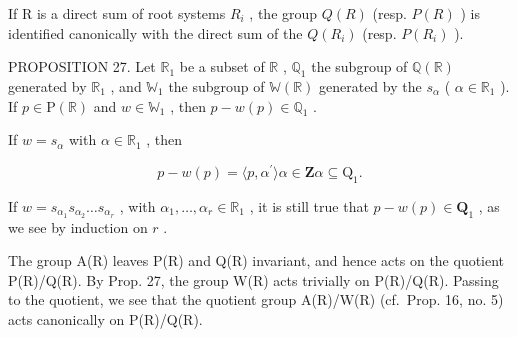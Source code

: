 If R is a direct sum of root systems \(R_{i}\) , the group \(Q(R)\) (resp. \(P(R)\) ) is identified canonically with the direct sum of the \(Q(R_{i})\) (resp. \(P(R_{i})\) ).

PROPOSITION 27. Let \(\mathbb{R}_1\) be a subset of \(\mathbb{R}\) , \(\mathbb{Q}_1\) the subgroup of \(\mathbb{Q}(\mathbb{R})\) generated by \(\mathbb{R}_1\) , and \(\mathbb{W}_1\) the subgroup of \(\mathbb{W}(\mathbb{R})\) generated by the \(s_\alpha\) ( \(\alpha \in \mathbb{R}_1\) ). If \(p \in \mathrm{P}(\mathbb{R})\) and \(w \in \mathbb{W}_1\) , then \(p - w(p) \in \mathbb{Q}_1\) .

If \(w = s_{\alpha}\) with \(\alpha \in \mathbb{R}_1\) , then

\[
p - w (p) = \langle p, \alpha^ {\prime} \rangle \alpha \in \mathbf {Z} \alpha \subseteq \mathrm{Q} _ {1}.
\]

If \(w = s_{\alpha_1}s_{\alpha_2}\ldots s_{\alpha_r}\) , with \(\alpha_{1},\ldots ,\alpha_{r}\in \mathbb{R}_{1}\) , it is still true that \(p - w(p)\in \mathbf{Q}_1\) , as we see by induction on \(r\) .

The group A(R) leaves P(R) and Q(R) invariant, and hence acts on the quotient P(R)/Q(R). By Prop. 27, the group W(R) acts trivially on P(R)/Q(R). Passing to the quotient, we see that the quotient group A(R)/W(R) (cf.~Prop. 16, no. 5) acts canonically on P(R)/Q(R).

